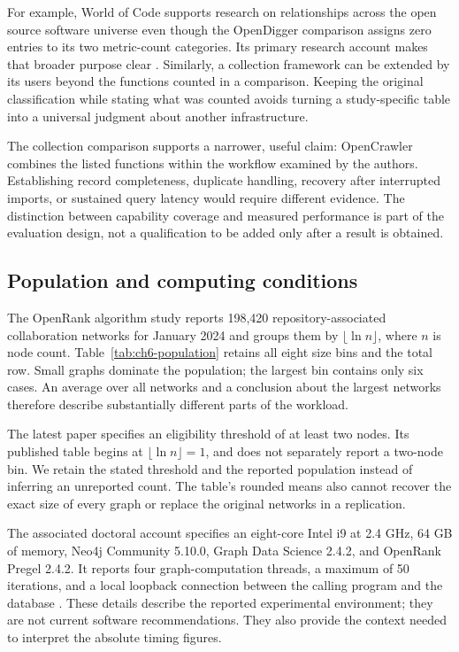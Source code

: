 


For example, World of Code supports research on relationships across the open source software universe even though the OpenDigger comparison assigns zero entries to its two metric-count categories. Its primary research account makes that broader purpose clear \citep{ma2019}. Similarly, a collection framework can be extended by its users beyond the functions counted in a comparison. Keeping the original classification while stating what was counted avoids turning a study-specific table into a universal judgment about another infrastructure.

The collection comparison supports a narrower, useful claim: OpenCrawler combines the listed functions within the workflow examined by the authors. Establishing record completeness, duplicate handling, recovery after interrupted imports, or sustained query latency would require different evidence. The distinction between capability coverage and measured performance is part of the evaluation design, not a qualification to be added only after a result is obtained.

\subsection{Population and computing conditions}
The OpenRank algorithm study reports 198,420 repository-associated collaboration networks for January 2024 and groups them by \(\lfloor\ln n\rfloor\), where \(n\) is node count. Table~\ref{tab:ch6-population} retains all eight size bins and the total row. Small graphs dominate the population; the largest bin contains only six cases. An average over all networks and a conclusion about the largest networks therefore describe substantially different parts of the workload.



The latest paper specifies an eligibility threshold of at least two nodes. Its published table begins at \(\lfloor\ln n\rfloor=1\), and does not separately report a two-node bin. We retain the stated threshold and the reported population instead of inferring an unreported count. The table's rounded means also cannot recover the exact size of every graph or replace the original networks in a replication.

The associated doctoral account specifies an eight-core Intel i9 at 2.4 GHz, 64 GB of memory, Neo4j Community 5.10.0, Graph Data Science 2.4.2, and OpenRank Pregel 2.4.2. It reports four graph-computation threads, a maximum of 50 iterations, and a local loopback connection between the calling program and the database \citep[Section 4.3.2]{zhao2025thesis}. These details describe the reported experimental environment; they are not current software recommendations. They also provide the context needed to interpret the absolute timing figures.

